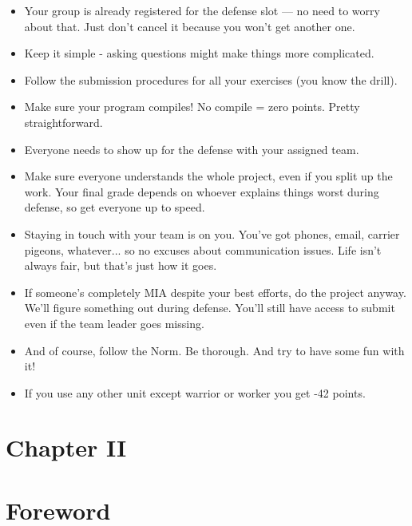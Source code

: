 \documentclass[12pt]{article}
\begin{document}
\begin{itemize}
  \item Your group is already registered for the defense slot — no need to worry about that. Just don't cancel it because you won't get another one.
  \item Keep it simple - asking questions might make things more complicated.
  \item Follow the submission procedures for all your exercises (you know the drill).
  \item Make sure your program compiles! No compile = zero points. Pretty straightforward.
  \item Everyone needs to show up for the defense with your assigned team.
  \item Make sure everyone understands the whole project, even if you split up the work. Your final grade depends on whoever explains things worst during defense, so get everyone up to speed.
  \item Staying in touch with your team is on you. You've got phones, email, carrier pigeons, whatever... so no excuses about communication issues. Life isn't always fair, but that's just how it goes.
  \item If someone's completely MIA despite your best efforts, do the project anyway. We'll figure something out during defense. You'll still have access to submit even if the team leader goes missing.
  \item And of course, follow the Norm. Be thorough. And try to have some fun with it!
  \item If you use any other unit except warrior or worker you get -42 points.
\end{itemize}

\newpage

\section*{\LARGE Chapter II}
\section*{\LARGE Foreword}
\end{document}

